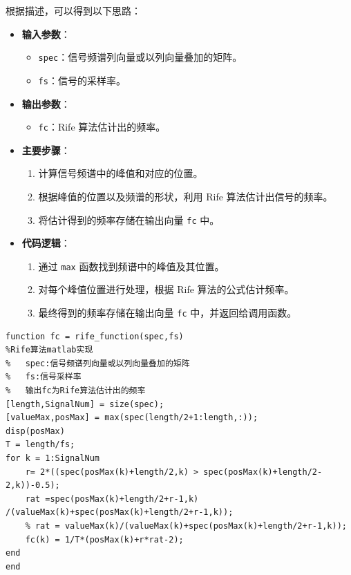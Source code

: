 \documentclass[a4paper,12pt]{article}
\begin{document}
根据描述，可以得到以下思路：

\begin{itemize}
    \item \textbf{输入参数}：
    \begin{itemize}
        \item \texttt{spec}：信号频谱列向量或以列向量叠加的矩阵。
        \item \texttt{fs}：信号的采样率。
    \end{itemize}
    
    \item \textbf{输出参数}：
    \begin{itemize}
        \item \texttt{fc}：Rife 算法估计出的频率。
    \end{itemize}
    
    \item \textbf{主要步骤}：
    \begin{enumerate}
        \item 计算信号频谱中的峰值和对应的位置。
        \item 根据峰值的位置以及频谱的形状，利用 Rife 算法估计出信号的频率。
        \item 将估计得到的频率存储在输出向量 \texttt{fc} 中。
    \end{enumerate}
    
    \item \textbf{代码逻辑}：
    \begin{enumerate}
        \item 通过 \texttt{max} 函数找到频谱中的峰值及其位置。
        \item 对每个峰值位置进行处理，根据 Rife 算法的公式估计频率。
        \item 最终得到的频率存储在输出向量 \texttt{fc} 中，并返回给调用函数。
    \end{enumerate}
\end{itemize}

\begin{lstlisting}
function fc = rife_function(spec,fs)
%Rife算法matlab实现
%   spec:信号频谱列向量或以列向量叠加的矩阵
%   fs:信号采样率
%   输出fc为Rife算法估计出的频率
[length,SignalNum] = size(spec);
[valueMax,posMax] = max(spec(length/2+1:length,:));
disp(posMax)
T = length/fs;
for k = 1:SignalNum
    r= 2*((spec(posMax(k)+length/2,k) > spec(posMax(k)+length/2-2,k))-0.5);
    rat =spec(posMax(k)+length/2+r-1,k) /(valueMax(k)+spec(posMax(k)+length/2+r-1,k));
    % rat = valueMax(k)/(valueMax(k)+spec(posMax(k)+length/2+r-1,k));
    fc(k) = 1/T*(posMax(k)+r*rat-2);
end
end

\end{lstlisting}
\end{document}
